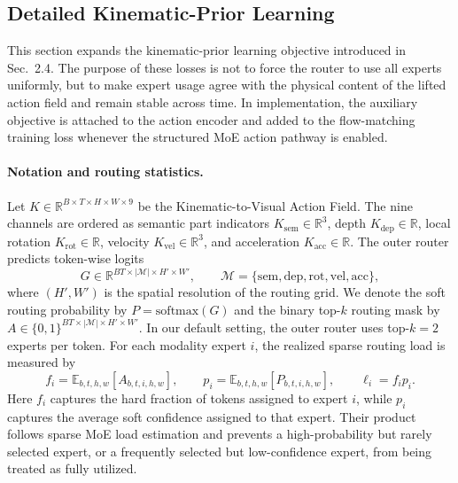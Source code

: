 \subsection{Detailed Kinematic-Prior Learning}
\label{app:detailed_kinematic_prior}

This section expands the kinematic-prior learning objective introduced in Sec.~2.4. The purpose of these losses is not to force the router to use all experts uniformly, but to make expert usage agree with the physical content of the lifted action field and remain stable across time. In implementation, the auxiliary objective is attached to the action encoder and added to the flow-matching training loss whenever the structured MoE action pathway is enabled.

\paragraph{Notation and routing statistics.}
Let $K\in\mathbb{R}^{B\times T\times H\times W\times 9}$ be the Kinematic-to-Visual Action Field. The nine channels are ordered as semantic part indicators $K_{\mathrm{sem}}\in\mathbb{R}^{3}$, depth $K_{\mathrm{dep}}\in\mathbb{R}$, local rotation $K_{\mathrm{rot}}\in\mathbb{R}$, velocity $K_{\mathrm{vel}}\in\mathbb{R}^{3}$, and acceleration $K_{\mathrm{acc}}\in\mathbb{R}$. The outer router predicts token-wise logits
\[
    G\in\mathbb{R}^{BT\times |\mathcal{M}|\times H'\times W'},\qquad
    \mathcal{M}=\{\mathrm{sem},\mathrm{dep},\mathrm{rot},\mathrm{vel},\mathrm{acc}\},
\]
where $(H',W')$ is the spatial resolution of the routing grid. We denote the soft routing probability by $P=\mathrm{softmax}(G)$ and the binary top-$k$ routing mask by $A\in\{0,1\}^{BT\times |\mathcal{M}|\times H'\times W'}$. In our default setting, the outer router uses top-$k=2$ experts per token. For each modality expert $i$, the realized sparse routing load is measured by
\[
    f_i=\mathbb{E}_{b,t,h,w}[A_{b,t,i,h,w}],\qquad
    p_i=\mathbb{E}_{b,t,h,w}[P_{b,t,i,h,w}],\qquad
    \ell_i=f_i p_i .
\]
Here $f_i$ captures the hard fraction of tokens assigned to expert $i$, while $p_i$ captures the average soft confidence assigned to that expert. Their product follows sparse MoE load estimation and prevents a high-probability but rarely selected expert, or a frequently selected but low-confidence expert, from being treated as fully utilized.

